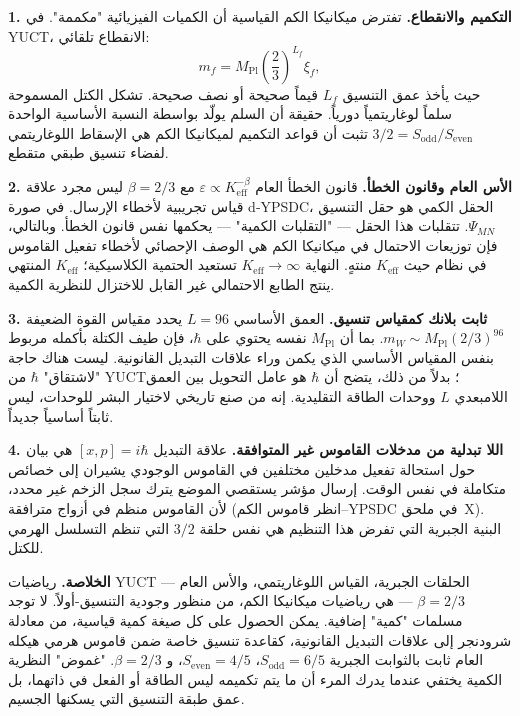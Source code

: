 \documentclass[11pt,a4paper]{article}
\begin{document}
	\medskip
	\noindent\textbf{1. التكميم والانقطاع.}
	تفترض ميكانيكا الكم القياسية أن الكميات الفيزيائية "مكممة". في YUCT، الانقطاع تلقائي:
	\[
	m_f = M_{\mathrm{Pl}} \left( \frac{2}{3} \right)^{L_f} \xi_f,
	\]
	حيث يأخذ عمق التنسيق $L_f$ قيماً صحيحة أو نصف صحيحة. تشكل الكتل المسموحة سلماً لوغاريتمياً دورياً. حقيقة أن السلم يولّد بواسطة النسبة الأساسية الواحدة $3/2 = S_{\mathrm{odd}}/S_{\mathrm{even}}$ تثبت أن قواعد التكميم لميكانيكا الكم هي الإسقاط اللوغاريتمي لفضاء تنسيق طبقي متقطع.
	
	\medskip
	\noindent\textbf{2. الأس العام وقانون الخطأ.}
	قانون الخطأ العام $\varepsilon \propto K_{\mathrm{eff}}^{-\beta}$ مع $\beta = 2/3$ ليس مجرد علاقة قياس تجريبية لأخطاء الإرسال. في صورة d‑YPSDC، الحقل الكمي هو حقل التنسيق $\Psi_{MN}$. تتقلبات هذا الحقل --- "التقلبات الكمية" --- يحكمها نفس قانون الخطأ. وبالتالي، فإن توزيعات الاحتمال في ميكانيكا الكم هي الوصف الإحصائي لأخطاء تفعيل القاموس في نظام حيث $K_{\mathrm{eff}}$ منتهٍ. النهاية $K_{\mathrm{eff}}\to\infty$ تستعيد الحتمية الكلاسيكية؛ $K_{\mathrm{eff}}$ المنتهي ينتج الطابع الاحتمالي غير القابل للاختزال للنظرية الكمية.
	
	\medskip
	\noindent\textbf{3. ثابت بلانك كمقياس تنسيق.}
	العمق الأساسي $L=96$ يحدد مقياس القوة الضعيفة $m_W \sim M_{\mathrm{Pl}}(2/3)^{96}$. بما أن $M_{\mathrm{Pl}}$ نفسه يحتوي على $\hbar$، فإن طيف الكتلة بأكمله مربوط بنفس المقياس الأساسي الذي يكمن وراء علاقات التبديل القانونية. ليست هناك حاجة "لاشتقاق" $\hbar$ من YUCT؛ بدلاً من ذلك، يتضح أن $\hbar$ هو عامل التحويل بين العمق اللامبعدي $L$ ووحدات الطاقة التقليدية. إنه من صنع تاريخي لاختيار البشر للوحدات، ليس ثابتاً أساسياً جديداً.
	
	\medskip
	\noindent\textbf{4. اللا تبدلية من مدخلات القاموس غير المتوافقة.}
	علاقة التبديل $[x,p]=i\hbar$ هي بيان حول استحالة تفعيل مدخلين مختلفين في القاموس الوجودي يشيران إلى خصائص متكاملة في نفس الوقت. إرسال مؤشر يستقصي الموضع يترك سجل الزخم غير محدد، لأن القاموس منظم في أزواج مترافقة (انظر قاموس الكم–YPSDC في ملحق~X). البنية الجبرية التي تفرض هذا التنظيم هي نفس حلقة $3/2$ التي تنظم التسلسل الهرمي للكتل.
	
	\medskip
	\noindent
	\textbf{الخلاصة.} رياضيات YUCT --- الحلقات الجبرية، القياس اللوغاريتمي، والأس العام $\beta=2/3$ --- هي رياضيات ميكانيكا الكم، من منظور وجودية التنسيق-أولاً. لا توجد مسلمات "كمية" إضافية. يمكن الحصول على كل صيغة كمية قياسية، من معادلة شرودنجر إلى علاقات التبديل القانونية، كقاعدة تنسيق خاصة ضمن قاموس هرمي هيكله العام ثابت بالثوابت الجبرية $S_{\mathrm{odd}}=6/5$، $S_{\mathrm{even}}=4/5$، و $\beta=2/3$. "غموض" النظرية الكمية يختفي عندما يدرك المرء أن ما يتم تكميمه ليس الطاقة أو الفعل في ذاتهما، بل عمق طبقة التنسيق التي يسكنها الجسيم.
	
\end{document}
